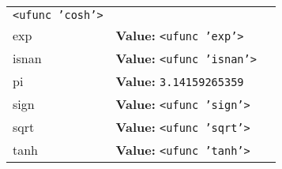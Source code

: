 \begin{longtable}{|p{\varnamewidth}|p{\vardescrwidth}|l}
{\tt {\textless}ufunc 'cosh'{\textgreater}}&\\
\cline{1-2}
\raggedright e\-x\-p\- & \raggedright \textbf{Value:} 
{\tt {\textless}ufunc 'exp'{\textgreater}}&\\
\cline{1-2}
\raggedright i\-s\-n\-a\-n\- & \raggedright \textbf{Value:} 
{\tt {\textless}ufunc 'isnan'{\textgreater}}&\\
\cline{1-2}
\raggedright p\-i\- & \raggedright \textbf{Value:} 
{\tt 3.14159265359}&\\
\cline{1-2}
\raggedright s\-i\-g\-n\- & \raggedright \textbf{Value:} 
{\tt {\textless}ufunc 'sign'{\textgreater}}&\\
\cline{1-2}
\raggedright s\-q\-r\-t\- & \raggedright \textbf{Value:} 
{\tt {\textless}ufunc 'sqrt'{\textgreater}}&\\
\cline{1-2}
\raggedright t\-a\-n\-h\- & \raggedright \textbf{Value:} 
{\tt {\textless}ufunc 'tanh'{\textgreater}}&\\
\cline{1-2}
\end{longtable}

